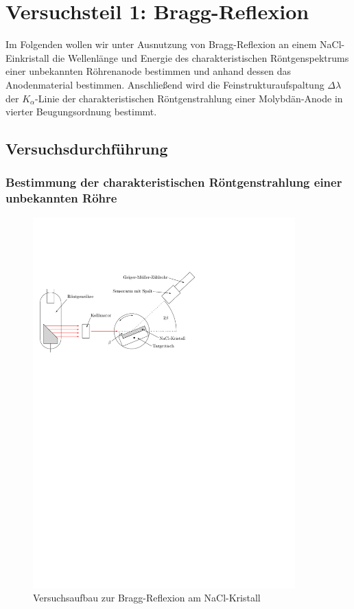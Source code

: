 \documentclass[11pt, a4paper]{article}
\begin{document}
\section{Versuchsteil 1: Bragg-Reflexion}
Im Folgenden wollen wir unter Ausnutzung von Bragg-Reflexion an einem NaCl-Einkristall die Wellenlänge und Energie des charakteristischen Röntgenspektrums einer unbekannten Röhrenanode bestimmen und anhand dessen das Anodenmaterial bestimmen.
Anschließend wird die Feinstrukturaufspaltung $\Delta \lambda$ der $K_\alpha$-Linie der charakteristischen Röntgenstrahlung einer Molybdän-Anode in vierter Beugungsordnung bestimmt.

\subsection{Versuchsdurchführung}
\subsubsection{Bestimmung der charakteristischen Röntgenstrahlung einer unbekannten Röhre}
\begin{figure}[h]
\centering
\includegraphics[width=0.9\textwidth]{./grafiken/aufbau_bragg.pdf}
\caption{Versuchsaufbau zur Bragg-Reflexion am NaCl-Kristall}
\label{fig:bragg_aufbau}
\end{figure}
\end{document}
